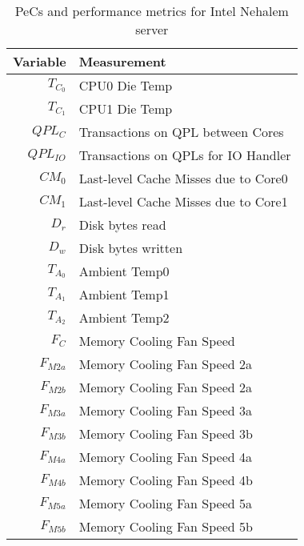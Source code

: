 \begin{table}[t!]
  \caption{PeCs and performance metrics for Intel Nehalem server}
  \centering
  \label{tab:intelmodel}
  \begin{tabular}{r l}
\hline
\textbf{Variable}&\textbf{Measurement}\\
\hline
$T_{C_{0}}$&CPU0 Die Temp\\
$T_{C_{1}}$&CPU1 Die Temp\\
$QPL_{C}$&Transactions on QPL between Cores\\
$QPL_{IO}$&Transactions on QPLs for IO Handler\\
$CM_{0}$&Last-level Cache Misses due to Core0\\
$CM_{1}$&Last-level Cache Misses due to Core1\\
$D_{r}$&Disk bytes read\\
$D_{w}$&Disk bytes written\\
$T_{A_{0}}$&Ambient Temp0\\
$T_{A_{1}}$&Ambient Temp1\\
$T_{A_{2}}$&Ambient Temp2\\
$F_{C}$&Memory Cooling Fan Speed\\
$F_{M2a}$&Memory Cooling Fan Speed 2a\\
$F_{M2b}$&Memory Cooling Fan Speed 2a\\
$F_{M3a}$&Memory Cooling Fan Speed 3a\\
$F_{M3b}$&Memory Cooling Fan Speed 3b\\
$F_{M4a}$&Memory Cooling Fan Speed 4a\\
$F_{M4b}$&Memory Cooling Fan Speed 4b\\
$F_{M5a}$&Memory Cooling Fan Speed 5a\\
$F_{M5b}$&Memory Cooling Fan Speed 5b\\
\hline
  \end{tabular}
\end{table}


